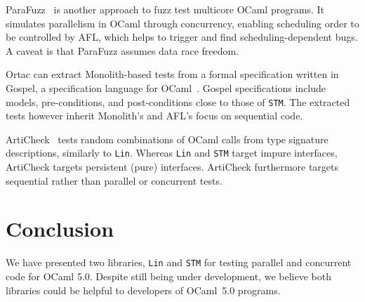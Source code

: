 \documentclass[twocolumn,10pt]{article}
\begin{document}
ParaFuzz~\cite{padhiyarParafuzzCoverageguidedProperty2021} is another approach to fuzz test multicore OCaml programs.
It simulates parallelism in OCaml through concurrency, enabling scheduling order to be controlled by AFL,
which helps to trigger and find scheduling-dependent bugs. A caveat is that ParaFuzz assumes
data race freedom.

Ortac can extract Monolith-based tests from a formal specification
written in Gospel, a specification language for OCaml~\cite{osborne:hal-03328646}.
Gospel specifications include models, pre-conditions, and
post-conditions close to those of \texttt{STM}. The extracted tests
however inherit Monolith's and AFL's focus on sequential code.


ArtiCheck~\cite{braibantWelltypedSmartFuzzing2014} tests random combinations of OCaml calls from
type signature descriptions, similarly to \texttt{Lin}. Whereas \texttt{Lin} and
\texttt{STM} target impure interfaces, ArtiCheck targets persistent
(pure) interfaces. ArtiCheck furthermore targets sequential rather
than parallel or concurrent tests.


\section{Conclusion}

We have presented two libraries, \texttt{Lin} and \texttt{STM} for testing parallel
and concurrent code for OCaml 5.0. Despite still being under
development, we believe both libraries could be helpful to developers
of OCaml~5.0 programs.


\printbibliography
\end{document}
